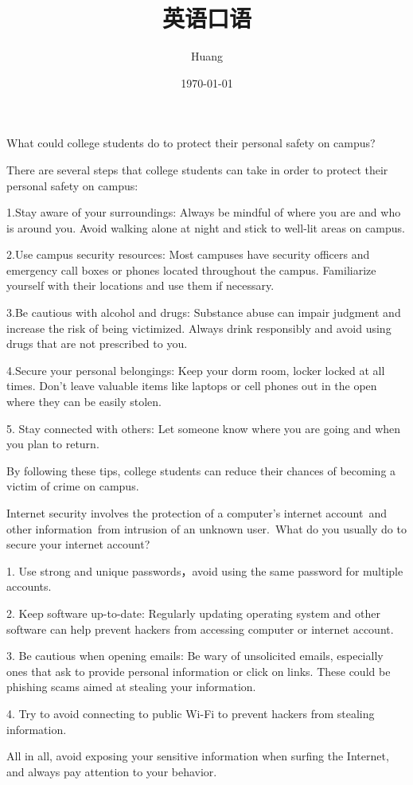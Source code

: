 \documentclass[lang=cn,10pt]{elegantbook}
\title{英语口语}
\author{ Huang}
\date{\today}
\begin{document}
	
	\maketitle
	\frontmatter
	
	
	\mainmatter
\begin{example}
	What could college students do to protect their personal safety on campus?
\end{example}
\begin{solution}
	There are several steps that college students can take in order to protect their personal safety on campus:
	
	1.Stay aware of your surroundings: Always be mindful of where you are and who is around you. Avoid walking alone at night and stick to well-lit areas on campus.
	
	2.Use campus security resources: Most campuses have security officers and emergency call boxes or phones located throughout the campus. Familiarize yourself with their locations and use them if necessary.
	
	3.Be cautious with alcohol and drugs: Substance abuse can impair judgment and increase the risk of being victimized. Always drink responsibly and avoid using drugs that are not prescribed to you.
	
	4.Secure your personal belongings: Keep your dorm room, locker locked at all times. Don't leave valuable items like laptops or cell phones out in the open where they can be easily stolen.
	
	5. Stay connected with others: Let someone know where you are going and when you plan to return. 
	
	By following these tips, college students can reduce their chances of becoming a victim of crime on campus.
\end{solution}
\begin{example}
	Internet security involves the protection of a computer's internet account and other information from intrusion of an unknown user. What do you usually do to secure your internet account?
\end{example}
\begin{solution}
	1. Use strong and unique passwords，avoid using the same password for multiple accounts.
	
	2. Keep software up-to-date: Regularly updating operating system and other software can help prevent hackers from accessing computer or internet account.
	
	3. Be cautious when opening emails: Be wary of unsolicited emails, especially ones that ask to provide personal information or click on links. These could be phishing scams aimed at stealing your information.
	
	4. Try to avoid connecting to public Wi-Fi to prevent hackers from stealing information.
	
	All in all, avoid exposing your sensitive information when surfing the Internet, and always pay attention to your behavior.
\end{solution}
\end{document}
